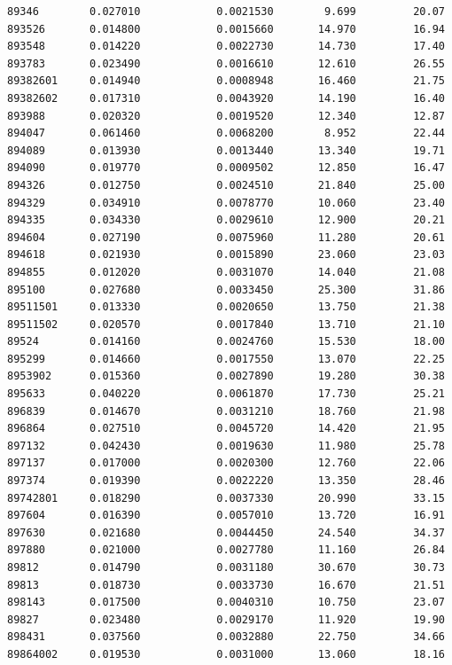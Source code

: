 \documentclass[
  letterpaper,
  DIV=11,
  numbers=noendperiod]{scrartcl}
\begin{document}
\begin{verbatim}
89346        0.027010            0.0021530        9.699         20.07
893526       0.014800            0.0015660       14.970         16.94
893548       0.014220            0.0022730       14.730         17.40
893783       0.023490            0.0016610       12.610         26.55
89382601     0.014940            0.0008948       16.460         21.75
89382602     0.017310            0.0043920       14.190         16.40
893988       0.020320            0.0019520       12.340         12.87
894047       0.061460            0.0068200        8.952         22.44
894089       0.013930            0.0013440       13.340         19.71
894090       0.019770            0.0009502       12.850         16.47
894326       0.012750            0.0024510       21.840         25.00
894329       0.034910            0.0078770       10.060         23.40
894335       0.034330            0.0029610       12.900         20.21
894604       0.027190            0.0075960       11.280         20.61
894618       0.021930            0.0015890       23.060         23.03
894855       0.012020            0.0031070       14.040         21.08
895100       0.027680            0.0033450       25.300         31.86
89511501     0.013330            0.0020650       13.750         21.38
89511502     0.020570            0.0017840       13.710         21.10
89524        0.014160            0.0024760       15.530         18.00
895299       0.014660            0.0017550       13.070         22.25
8953902      0.015360            0.0027890       19.280         30.38
895633       0.040220            0.0061870       17.730         25.21
896839       0.014670            0.0031210       18.760         21.98
896864       0.027510            0.0045720       14.420         21.95
897132       0.042430            0.0019630       11.980         25.78
897137       0.017000            0.0020300       12.760         22.06
897374       0.019390            0.0022220       13.350         28.46
89742801     0.018290            0.0037330       20.990         33.15
897604       0.016390            0.0057010       13.720         16.91
897630       0.021680            0.0044450       24.540         34.37
897880       0.021000            0.0027780       11.160         26.84
89812        0.014790            0.0031180       30.670         30.73
89813        0.018730            0.0033730       16.670         21.51
898143       0.017500            0.0040310       10.750         23.07
89827        0.023480            0.0029170       11.920         19.90
898431       0.037560            0.0032880       22.750         34.66
89864002     0.019530            0.0031000       13.060         18.16

\end{verbatim}
\end{document}
